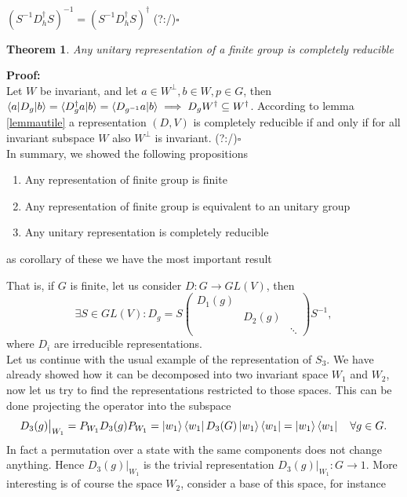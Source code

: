 \documentclass[12pt]{book}
\theoremstyle{plain}
\newtheorem{thm}{Theorem}[section]
\theoremstyle{definition}
\theoremstyle{remark}
\begin{document}
$(S^{-1}D_h^\dagger S)^{-1} = (S^{-1}D_h^\dagger S)^\dagger$ \hfill(?:/)\ensuremath{\square}
\begin{thm}
Any unitary representation of a finite group is completely reducible
\end{thm}
\hspace{-1.4em}\textbf{Proof:}\\
Let $W$ be invariant, and let $a\in W^\perp,b\in W,p\in G$, then $\braket{a|D_g|b} = \braket{D_g^\dagger a|b} = \braket{D_{g^{-1}}a|b}\implies D_g W^\dagger \subseteq W^\dagger$. 
According to lemma \ref{lemmautile} a representation $(D,V)$ is completely reducible if and only if for all invariant subspace $W$ also $W^\perp$ is invariant. \hfill(?:/)\ensuremath{\square}\\
In summary, we showed the following propositions
\begin{enumerate}
	\item Any representation of finite group is finite
	\item Any representation of finite group is equivalent to an unitary group
	\item Any unitary representation is completely reducible
\end{enumerate}
as corollary of these we have the most important result
\begin{center}
\end{center}
That is, if $G$ is finite, let us consider $D:G\to GL(V)$, then 
\[\exists S\in GL(V): D_g = S\begin{pmatrix}D_1(g)\\&D_2(g)\\&&\ddots\end{pmatrix}S^{-1},\]
where $D_i$ are irreducible representations.\\
Let us continue with the usual example of the representation of $S_3$. We have already showed how it can be decomposed into two invariant space $W_1$ and $W_2$, now let us try to find the representations restricted to those spaces. This can be done projecting the operator into the subspace
\[D_3(g)\big|_{W_1} = P_{W_1}D_3(g)P_{W_1} = \ket{w_1}\bra{w_1}D_3(G)\ket{w_1}\bra{w_1} = \ket{w_1}\bra{w_1}\quad \forall g\in G.\]
In fact a permutation over a state with the same components does not change anything. Hence $D_3(g)\big|_{W_1}$ is the trivial representation $D_3(g)\big|_{W_1}:G\to 1$. More interesting is of course the space $W_2$, consider a base of this space, for instance
\end{document}
